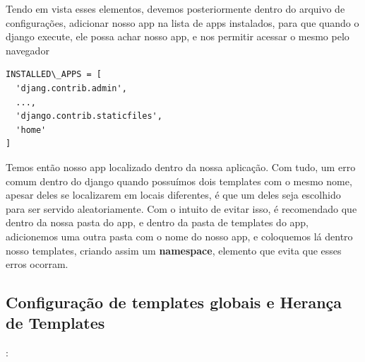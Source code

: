 \documentclass[12pt, a4paper]{paper}
\begin{document}
Tendo em vista esses elementos, devemos posteriormente dentro do arquivo de 
configurações, adicionar nosso app na lista de apps instalados, para que quando
o django execute, ele possa achar nosso app, e nos permitir acessar o mesmo
pelo navegador

\begin{verbatim}
INSTALLED\_APPS = [
  'djang.contrib.admin',
  ...,
  'django.contrib.staticfiles',
  'home'
]
\end{verbatim}

Temos então nosso app localizado dentro da nossa aplicação. Com tudo, um erro 
comum dentro do django quando possuímos dois templates com o mesmo nome, apesar 
deles se localizarem em locais diferentes, é que um deles seja escolhido  para 
ser servido aleatoriamente. Com o intuito de evitar isso, é recomendado que dentro 
da nossa pasta do app, e dentro da pasta de templates do app, adicionemos uma outra 
pasta com o nome do nosso app, e coloquemos lá dentro nosso templates, criando assim 
um \textbf{namespace}, elemento que evita que esses erros ocorram.

\subsection{Configuração de templates globais e Herança de Templates} %
\label{sub:Configuração de templates globais e Herança de Templates}



:
\end{document}
